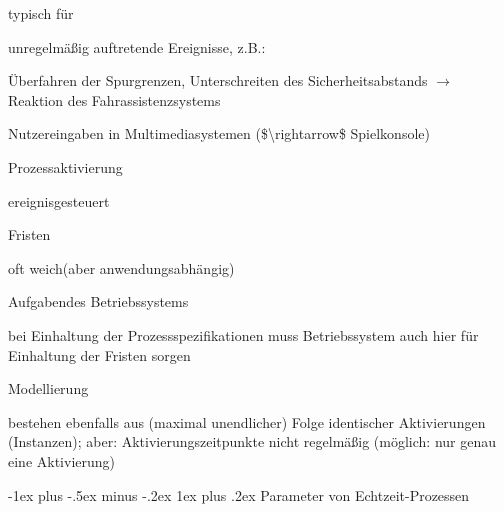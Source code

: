 \documentclass[a4paper]{article}
\makeatletter
\renewcommand{\subsubsection}{\@startsection{subsubsection}{3}{0mm}%
 {-1ex plus -.5ex minus -.2ex}%
 {1ex plus .2ex}%
 {\normalfont\small\bfseries}}
\makeatother
\begin{document}
\begin{multicols}{3}
    \begin{itemize*}
        \item
        typisch für
        \begin{itemize*}
            \item unregelmäßig auftretende Ereignisse, z.B.: \begin{itemize*} \item   Überfahren der Spurgrenzen, Unterschreiten des Sicherheitsabstands   $\rightarrow$  Reaktion des Fahrassistenzsystems \item   Nutzereingaben in Multimediasystemen   (\$\textbackslash rightarrow\$ Spielkonsole) \end{itemize*}
        \end{itemize*}
        \item
        Prozessaktivierung
        \begin{itemize*}
            \item ereignisgesteuert
        \end{itemize*}
        \item
        Fristen
        \begin{itemize*}
            \item oft weich(aber anwendungsabhängig)
        \end{itemize*}
        \item
        Aufgabendes Betriebssystems
        \begin{itemize*}
            \item bei Einhaltung der Prozessspezifikationen muss Betriebssystem auch hier für Einhaltung der Fristen sorgen
        \end{itemize*}
        \item
        Modellierung
        \begin{itemize*}
            \item bestehen ebenfalls aus (maximal unendlicher) Folge identischer Aktivierungen (Instanzen); aber: Aktivierungszeitpunkte nicht regelmäßig (möglich: nur genau eine Aktivierung)
        \end{itemize*}
    \end{itemize*}


    \subsubsection{Parameter von
        Echtzeit-Prozessen}


\end{multicols}
\end{document}
